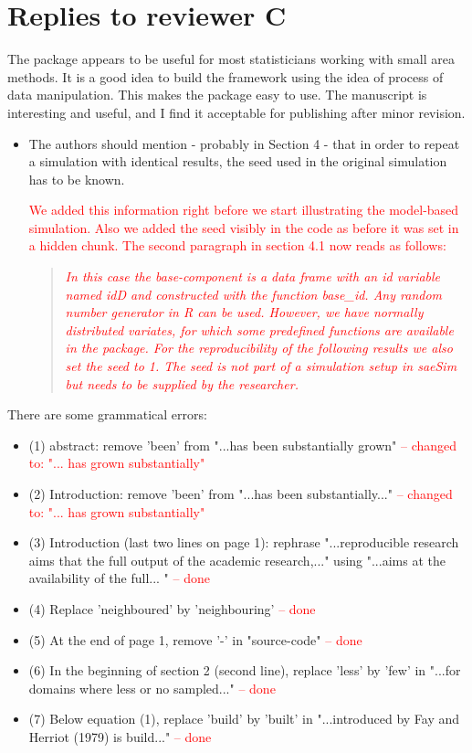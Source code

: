 \documentclass[11pt]{article}
\begin{document}
\pagebreak
\section*{Replies to reviewer C}

The package appears to be useful for most statisticians working with small area methods. It is a good idea to build the framework using the idea of process of data manipulation. This makes the package easy to use. The manuscript is interesting and useful, and I find it acceptable for
publishing after minor revision.

\begin{itemize}
\item
	The authors should mention - probably in Section 4 - that in order to repeat a simulation with identical results, the seed used in the original simulation has to be known. 
	
	\textcolor{red}{We added this information right before we start illustrating the model-based simulation. Also we added the seed visibly in the code as before it was set in a hidden chunk. The second paragraph in section 4.1 now reads as follows:}
	\begin{quote}
	\textit{
\textcolor{red}{In this case the \textit{base-component} is a data frame with an id variable named idD and constructed with the function base\_id. Any random number generator in R can be used. However, we have normally distributed variates, for which some predefined functions are available in the package. For the reproducibility of the following results we also set the seed to 1. The seed is not part of a simulation setup in saeSim but needs to be supplied by the researcher.
	}
	}
	\end{quote}
\end{itemize}

\vspace{0.5cm}

\noindent There are some grammatical errors:

\begin{itemize}
\item
	(1) abstract: remove 'been' from "...has been substantially grown" \textcolor{red}{-- changed to: "... has grown substantially"}
\item
	(2) Introduction: remove 'been' from "...has been substantially..." \textcolor{red}{-- changed to: "... has grown substantially"}
\item
	(3) Introduction (last two lines on page 1): rephrase "...reproducible research aims that the full output of the academic research,..." using "...aims at the availability of the full... " \textcolor{red}{-- done}
\item
	(4) Replace 'neighboured' by 'neighbouring' \textcolor{red}{-- done}
\item
	(5) At the end of page 1, remove '-' in "source-code" \textcolor{red}{-- done}
\item
	(6) In the beginning of section 2 (second line), replace 'less' by 'few' in "...for domains where less or no sampled..." \textcolor{red}{-- done}
\item
	(7) Below equation (1), replace 'build' by 'built' in "...introduced by Fay and Herriot (1979) is build..." \textcolor{red}{-- done}
\end{itemize}
\end{document}
